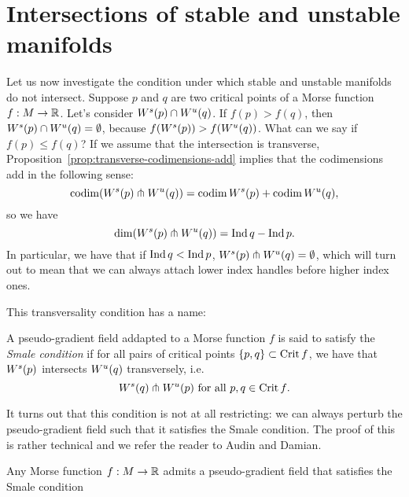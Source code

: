     \section{Intersections of stable and unstable manifolds}
    Let us now investigate the condition under which stable and unstable manifolds do not intersect.
    Suppose $p$ and $q$ are two critical points of a Morse function $f: M \to  \mathbb{R}$.
    Let's consider $W^s(p) \cap W^u(q)$.
    If $f(p) > f(q)$, then  $W^s(p) \cap W^u(q) = \emptyset$, because $f(W^s(p)) > f(W^u(q))$.
    What can we say if $f(p) \le  f(q)$?
    If we assume that the intersection is transverse, Proposition~\ref{prop:transverse-codimensions-add} implies that the codimensions add in the following sense:
    \[
        \operatorname{codim}(W^s(p) \pitchfork  W^u(q)) = \operatorname{codim} W^s(p) + \operatorname{codim} W^u(q)
    ,\] 
    so we have
    \[
        \dim(W^s(p) \pitchfork W^u(q)) = \operatorname{Ind} q - \operatorname{Ind} p
    .\]
    In particular, we have that if $\operatorname{Ind} q < \operatorname{Ind} p$,  $W^s(p) \pitchfork W^u(q) = \emptyset$, which will turn out to mean that we can always attach lower index handles before higher index ones.


    This transversality condition has a name:
    \begin{definition}
        A pseudo-gradient field addapted to a Morse function $f$ is said to satisfy the \emph{Smale condition} if for all pairs of critical points $ \{p, q\}  \subset \operatorname{Crit} f$, we have that $W^s(p)$ intersects  $W^u(q)$ transversely, i.e. 
        \[
            W^s(q) \pitchfork  W^u(p) \text{ for all $p, q \in \operatorname{Crit} f$}
        .\] 
    \end{definition}
    It turns out that this condition is not at all restricting: we can always perturb the pseudo-gradient field such that it satisfies the Smale condition. The proof of this is rather technical and we refer the reader to Audin and Damian.
    \begin{theorem}
        Any Morse function $f:M \to  \mathbb{R}$ admits a pseudo-gradient field that satisfies the Smale condition
    \end{theorem}


